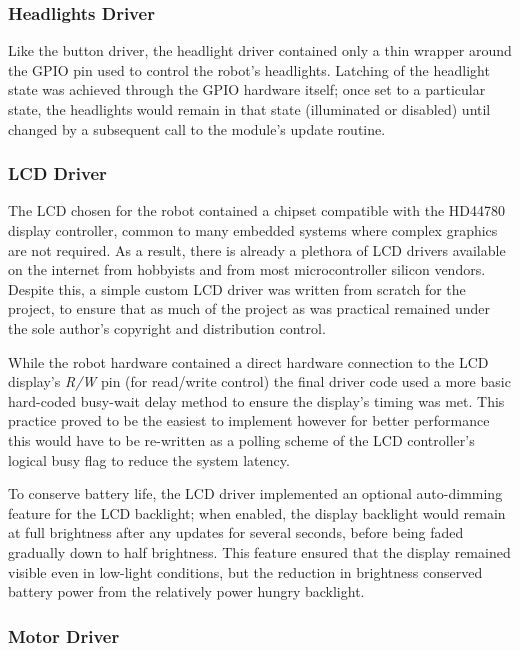 \FloatBarrier
\subsubsection{Headlights Driver}

Like the button driver, the headlight driver contained only a thin wrapper around the GPIO pin used to control the robot's headlights. Latching of the headlight state was achieved through the GPIO hardware itself; once set to a particular state, the headlights would remain in that state (illuminated or disabled) until changed by a subsequent call to the module's update routine.

\FloatBarrier
\subsubsection{LCD Driver}

The LCD chosen for the robot contained a chipset compatible with the HD44780 display controller, common to many embedded systems where complex graphics are not required. As a result, there is already a plethora of LCD drivers available on the internet from hobbyists and from most microcontroller silicon vendors. Despite this, a simple custom LCD driver was written from scratch for the project, to ensure that as much of the project as was practical remained under the sole author's copyright and distribution control.

While the robot hardware contained a direct hardware connection to the LCD display's \textit{R/W} pin (for read/write control) the final driver code used a more basic hard-coded busy-wait delay method to ensure the display's timing was met. This practice proved to be the easiest to implement however for better performance this would have to be re-written as a polling scheme of the LCD controller's logical busy flag to reduce the system latency.

To conserve battery life, the LCD driver implemented an optional auto-dimming feature for the LCD backlight; when enabled, the display backlight would remain at full brightness after any updates for several seconds, before being faded gradually down to half brightness. This feature ensured that the display remained visible even in low-light conditions, but the reduction in brightness conserved battery power from the relatively power hungry backlight.

\FloatBarrier
\subsubsection{Motor Driver}

